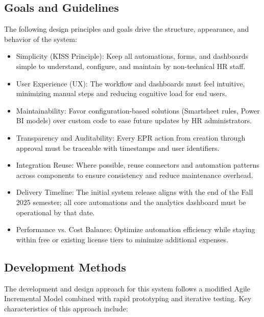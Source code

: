 \documentclass[12pt]{article}
\def\textbf#1{#1}%
\begin{document}
\subsection{Goals and Guidelines}

The following design principles and goals drive the structure, appearance, and behavior of the system:

\begin{itemize}[nosep]
    \item \textbf{Simplicity (KISS Principle):} Keep all automations, forms, and dashboards simple to understand, configure, and maintain by non-technical HR staff.
    \item \textbf{User Experience (UX):} The workflow and dashboards must feel intuitive, minimizing manual steps and reducing cognitive load for end users.
    \item \textbf{Maintainability:} Favor configuration-based solutions (Smartsheet rules, Power BI models) over custom code to ease future updates by HR administrators.
    \item \textbf{Transparency and Auditability:} Every EPR action from creation through approval must be traceable with timestamps and user identifiers.
    \item \textbf{Integration Reuse:} Where possible, reuse connectors and automation patterns across components to ensure consistency and reduce maintenance overhead.
    \item \textbf{Delivery Timeline:} The initial system release aligns with the end of the Fall 2025 semester; all core automations and the analytics dashboard must be operational by that date.
    \item \textbf{Performance vs. Cost Balance:} Optimize automation efficiency while staying within free or existing license tiers to minimize additional expenses.
\end{itemize}

\subsection{Development Methods}

The development and design approach for this system follows a modified \textbf{Agile Incremental Model} combined with rapid prototyping and iterative testing.
Key characteristics of this approach include:
\end{document}
